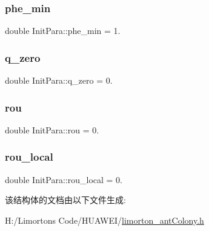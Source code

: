 \subsubsection{\texorpdfstring{phe\+\_\+min}{phe\_min}}
{\footnotesize\ttfamily double Init\+Para\+::phe\+\_\+min = 1.}

\mbox{\label{struct_init_para_a83780df87370e4fa2d5f048d0281c990}} 
\subsubsection{\texorpdfstring{q\+\_\+zero}{q\_zero}}
{\footnotesize\ttfamily double Init\+Para\+::q\+\_\+zero = 0.}

\mbox{\label{struct_init_para_a9c8024d7e8d60ffef01ade661bf0ec6a}} 
\subsubsection{\texorpdfstring{rou}{rou}}
{\footnotesize\ttfamily double Init\+Para\+::rou = 0.}

\mbox{\label{struct_init_para_a2d2de89821ca5c3f3d26a9a512422dbf}} 
\subsubsection{\texorpdfstring{rou\+\_\+local}{rou\_local}}
{\footnotesize\ttfamily double Init\+Para\+::rou\+\_\+local = 0.}



该结构体的文档由以下文件生成\+:\begin{DoxyCompactItemize}
\item 
H\+:/\+Limorton\textquotesingle{}s Code/\+H\+U\+A\+W\+E\+I/\hyperlink{limorton__ant_colony_8h}{limorton\+\_\+ant\+Colony.\+h}\end{DoxyCompactItemize}
